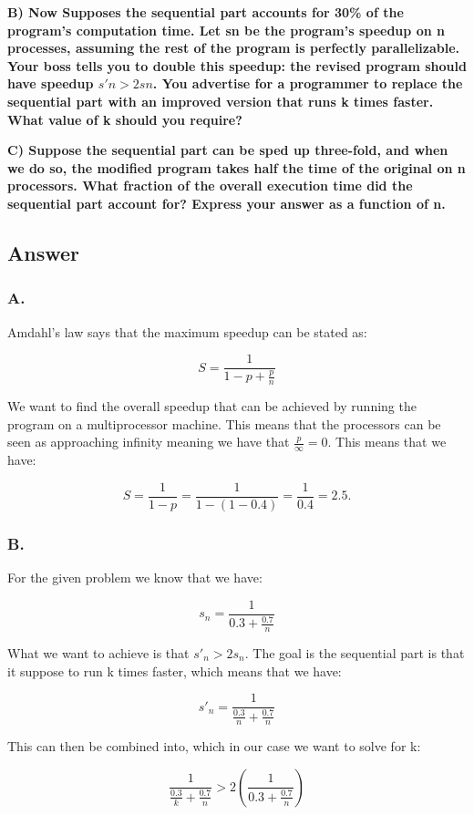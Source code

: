 \documentclass{article}
\begin{document}
\textbf{B) Now Supposes the sequential part accounts for 30\% of the program’s computation time. Let sn be the program’s speedup on n processes, assuming the rest of the program is perfectly parallelizable. Your boss tells you to double this speedup: the revised program should have speedup \(s'n > 2sn\). You advertise for a programmer to replace the sequential part with an improved version that runs k times faster. What value of k should you require?}

\textbf{C) Suppose the sequential part can be sped up three-fold, and when we do so, the modified program takes half the time of the original on n processors. What fraction of the overall execution time did the sequential part account for? Express your answer as a function of n.}

\subsection*{Answer}

\subsubsection*{A.}
Amdahl's law says that the maximum speedup can be stated as:

\[
S = \frac{1}{1 - p + \frac{p}{n}}
\]

We want to find the overall speedup that can be achieved by running the program on a multiprocessor machine. This means that the processors can be seen as approaching infinity meaning we have that \(\frac{p}{\infty} = 0\). This means that we have:

\[
S = \frac{1}{1 - p} = \frac{1}{1 - (1-0.4)} = \frac{1}{0.4} = 2.5.
\]

\subsubsection*{B.}
For the given problem we know that we have:

\[
s_n = \frac{1}{0.3 + \frac{0.7}{n}}
\]


What we want to achieve is that \(s'_n > 2s_n\). The goal is the sequential part is that it suppose to run k times faster, which means that we have:

\[
s'_n = \frac{1}{\frac{0.3}{n} + \frac{0.7}{n}}
\]

This can then be combined into, which in our case we want to solve for k: 

\[
\frac{1}{\frac{0.3}{k} + \frac{0.7}{n}} > 2 \left( \frac{1}{0.3 + \frac{0.7}{n}} \right)
\]
\end{document}
